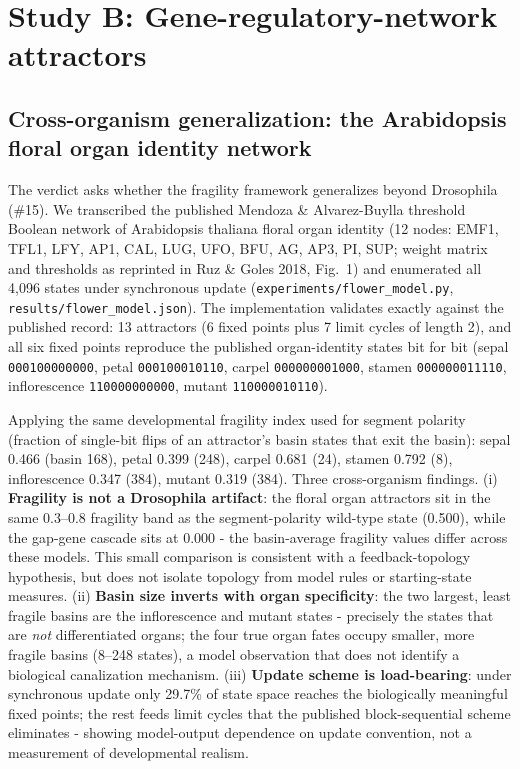 \documentclass[12pt]{article}
\begin{document}
\section{Study B: Gene-regulatory-network attractors}


\subsection{Cross-organism generalization: the Arabidopsis floral organ identity network}
\label{sec:flower}
The verdict asks whether the fragility framework generalizes beyond Drosophila
(\#15). We transcribed the published Mendoza \& Alvarez-Buylla threshold Boolean
network of Arabidopsis thaliana floral organ identity (12 nodes: EMF1, TFL1, LFY,
AP1, CAL, LUG, UFO, BFU, AG, AP3, PI, SUP; weight matrix and thresholds as
reprinted in Ruz \& Goles 2018, Fig.~1) and enumerated all 4{,}096 states under
synchronous update (\texttt{experiments/flower\_model.py},
\texttt{results/flower\_model.json}). The implementation validates exactly against
the published record: 13 attractors (6 fixed points plus 7 limit cycles of length
2), and all six fixed points reproduce the published organ-identity states bit for
bit (sepal \texttt{000100000000}, petal \texttt{000100010110}, carpel
\texttt{000000001000}, stamen \texttt{000000011110}, inflorescence
\texttt{110000000000}, mutant \texttt{110000010110}).

Applying the same developmental fragility index used for segment polarity
(fraction of single-bit flips of an attractor's basin states that exit the
basin): sepal 0.466 (basin 168), petal 0.399 (248), carpel 0.681 (24), stamen
0.792 (8), inflorescence 0.347 (384), mutant 0.319 (384). Three cross-organism
findings. (i) \textbf{Fragility is not a Drosophila artifact}: the floral organ
attractors sit in the same 0.3--0.8 fragility band as the segment-polarity
wild-type state (0.500), while the gap-gene cascade sits at 0.000 - the basin-average fragility values differ across these models. This small comparison is consistent with a feedback-topology hypothesis, but does not isolate topology from model rules or starting-state measures. (ii)
\textbf{Basin size inverts with organ specificity}: the two largest, least
fragile basins are the inflorescence and mutant states - precisely the states
that are \emph{not} differentiated organs; the four true organ fates occupy
smaller, more fragile basins (8--248 states), a model observation that does not identify a biological canalization mechanism. (iii) \textbf{Update scheme is load-bearing}:
under synchronous update only 29.7\% of state space reaches the biologically
meaningful fixed points; the rest feeds limit cycles that the published
block-sequential scheme eliminates - showing model-output dependence on update convention, not a measurement of developmental realism.
\end{document}
